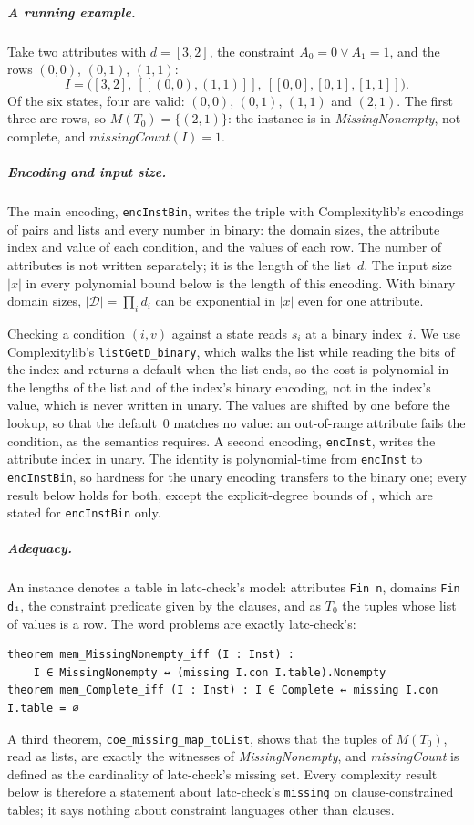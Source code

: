 \documentclass[a4paper,UKenglish,cleveref,autoref,thm-restate]{lipics-v2021}
\begin{document}
\subparagraph*{A running example.}
Take two attributes with $d = [3, 2]$, the constraint $A_0 = 0 \lor A_1 = 1$, and the rows
$(0,0)$, $(0,1)$, $(1,1)$:
\[
I = \bigl([3, 2],\ [[(0,0), (1,1)]],\ [[0,0], [0,1], [1,1]]\bigr).
\]
Of the six states, four are valid: $(0,0)$, $(0,1)$, $(1,1)$ and $(2,1)$. The first three are
rows, so $M(T_0) = \{(2,1)\}$: the instance is in \textit{MissingNonempty}, not complete, and
$\textit{missingCount}(I) = 1$.

\subparagraph*{Encoding and input size.}
The main encoding, \lstinline{encInstBin}, writes the triple with Complexitylib's encodings of
pairs and lists and every number in binary: the domain sizes, the attribute index and value of
each condition, and the values of each row. The number of attributes is not written separately;
it is the length of the list~$d$. The input size $|x|$ in every polynomial bound below is the
length of this encoding. With binary domain sizes, $|\mathcal{D}| = \prod_i d_i$ can be
exponential in $|x|$ even for one attribute.

Checking a condition $(i, v)$ against a state reads $s_i$ at a binary index~$i$. We use
Complexitylib's \lstinline{listGetD_binary}, which walks the list while reading the bits of the
index and returns a default when the list ends, so the cost is polynomial in the lengths of the
list and of the index's binary encoding, not in the index's value, which is never written in
unary. The values are shifted by
one before the lookup, so that the default~$0$ matches no value: an out-of-range attribute fails
the condition, as the semantics requires. A second encoding, \lstinline{encInst}, writes the
attribute index in unary. The identity is polynomial-time from \lstinline{encInst} to
\lstinline{encInstBin}, so hardness for the unary encoding transfers to the binary one; every
result below holds for both, except the explicit-degree bounds of , which are
stated for \lstinline{encInstBin} only.

\subparagraph*{Adequacy.}
An instance denotes a table in latc-check's model: attributes \lstinline{Fin n}, domains
\lstinline{Fin dᵢ}, the constraint predicate given by the clauses, and as $T_0$ the tuples whose
list of values is a row. The word problems are exactly latc-check's:
\begin{lstlisting}
theorem mem_MissingNonempty_iff (I : Inst) :
    I ∈ MissingNonempty ↔ (missing I.con I.table).Nonempty
theorem mem_Complete_iff (I : Inst) : I ∈ Complete ↔ missing I.con I.table = ∅
\end{lstlisting}
A third theorem, \lstinline{coe_missing_map_toList}, shows that the tuples of $M(T_0)$, read as
lists, are exactly the witnesses of \textit{MissingNonempty}, and \textit{missingCount} is
defined as the cardinality of latc-check's missing set. Every complexity result below is
therefore a statement about latc-check's \lstinline{missing} on clause-constrained tables; it
says nothing about constraint languages other than clauses.
\end{document}

